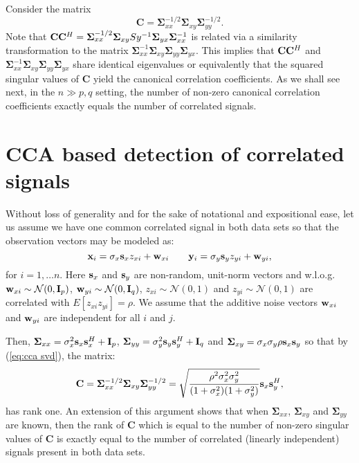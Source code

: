 \documentclass[conference]{IEEEtran}
\newcommand{\x}{\mathbf{x}}
\newcommand{\y}{\mathbf{y}}
\newcommand{\Sx}{\mathbf{\Sigma}_{xx}}
\newcommand{\Sy}{\mathbf{\Sigma}_{yy}}
\newcommand{\Sxy}{\mathbf{\Sigma}_{xy}}
\newcommand{\Syx}{\mathbf{\Sigma}_{yx}}
\newcommand{\CC}{\mathbf{C}}
\begin{document}
Consider the matrix
\begin{equation}\label{eq:cca svd}
\CC = \Sx^{-1/2} \Sxy \Sy^{-1/2}.
 \end{equation}
Note that ${\bf C}{\bf C}^{H} = \Sx^{-1/2} \Sxy Sy^{-1} \Syx \Sx^{-1} $ is related via a similarity transformation to the matrix $\Sx^{-1} \Sxy \Sy \Syx$. This implies that ${\bf C}{\bf C}^{H}$ and $\Sx^{-1} \Sxy \Sy \Syx$ share identical eigenvalues or equivalently that the squared singular values of $\CC$ yield the canonical correlation coefficients. As we shall see next, in the $n \gg p,q$ setting, the number of non-zero canonical correlation coefficients exactly equals the number of correlated signals.

\section{CCA based detection of correlated signals}\label{sec:cca detection}
Without loss of generality and for the sake of notational and expositional ease, let us assume we have one common correlated signal in both data sets so that the observation vectors may be modeled as:
$$
\x_i = \sigma_{x} {\bf s}_{x} z_{xi} + {\bf w}_{xi}  \qquad \y_i  = \sigma_{y} {\bf s}_{y} z_{yi} + {\bf w}_{yi},
$$
for $i = 1, \ldots n$. Here ${\bf s}_{x}$ and ${\bf s}_{y}$ are non-random, unit-norm vectors and w.l.o.g. ${\bf w}_{xi} \sim \mathcal{N}(0,{\bf I}_{p})$,  ${\bf w}_{yi} \sim \mathcal{N}(0,{\bf I}_{q})$, $z_{xi} \sim \mathcal{N}(0,1)$ and $z_{yi} \sim \mathcal{N}(0,1)$ are correlated with $E[z_{xi} z_{yi}] = \rho$. We assume that the additive noise vectors ${\bf w}_{xi}$ and ${\bf w}_{yi}$ are independent for all $i$ and $j$.

Then, $\Sx = \sigma_{x}^{2} {\bf s}_{x}{\bf s}_{x}^{H} + {\bf I}_p$, $\Sy = \sigma_{y}^{2} {\bf s}_{y}{\bf s}_{y}^{H} + {\bf I}_q$ and  $\Sxy = \sigma_{x} \sigma_{y} \rho {\bf s}_{x} {\bf s}_{y}$ so that by (\ref{eq:cca svd}), the matrix:
\begin{equation}\label{eq:true cca}
\CC = \Sx^{-1/2} \Sxy \Sy^{-1/2} = \sqrt{\dfrac{\rho^2 \sigma_{x}^2\sigma^2_{y}}{(1+\sigma_x^{2})(1+\sigma_y^{2})}}  {\bf s}_{x} {\bf s}_{y}^{H},
\end{equation}
has rank one. An extension of this argument shows that when $\Sx$, $\Sxy$ and $\Sy$ are known, then the rank of $\CC$ which is equal to the number of non-zero singular values of $\CC$ is exactly equal to the number of correlated (linearly independent) signals present in both data sets.
\end{document}
